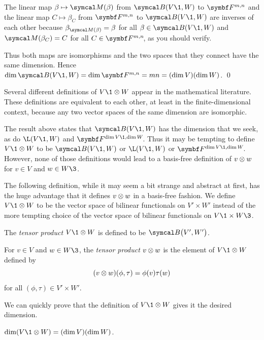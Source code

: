 The linear map $\beta \mapsto \M(\beta)$ from $\B(V\1, W)$ to $\F{m,n}$ and the linear map $C \mapsto \beta_C$ from
$\F{m,n}$ to $\B(V\1,W)$ are inverses of each other because $\beta_{\M(\beta)} = \beta$ for all $\beta \in \B(V\1, W)$ and
$\M(\beta_C) = C$ for all $C \in \FF{m,n}$, as you should verify.

Thus both maps are isomorphisms and the two spaces that they connect have the same dimension. Hence
$\dim \B(V\1,W)= \dim \F{m,n} = mn = (\dim V)(\dim W)$.
\qed

Several different definitions of $V\1 \tensor W$ appear in the mathematical literature. These definitions are equivalent to each other, at least in the finite-dimensional context, because any two vector spaces of the same dimension are isomorphic.

The result above states that $\B(V\1, W)$ has the dimension that we seek, as do $\L(V\1, W)$ and $\FF{\dim V\1, \dim W}$. Thus it may be tempting to define $V\1 \tensor W$ to be $\B(V\1, W)$ or $\L(V\1, W)$ or $\FF{\dim V\1, \dim W}$. However, none of those definitions would lead to a basis-free definition of $v \otimes w$ for $v \in V$ and $w \in W\3$.

The following definition, while it may seem a bit strange and abstract at first, has the huge advantage that it defines $v \otimes w$ in a basis-free fashion. We define $V\1 \tensor W$ to be the vector space of bilinear functionals on $V'\! \times W'$ instead of the more tempting choice of the vector space of bilinear functionals on $V\1 \times W\3$.

{\vspace{-2.3bp}
\begin{Itemize}\addtolength{\itemsep}{-.01in}
\item
The \emph{tensor product} $V\1 \tensor W$ is defined to be $\B\paren[\big]{V', W'}$.
\item
For $v \in V$ and $w \in W\3$, the \emph{tensor product} $v \otimes w$ is the element of $V\1 \tensor W$ defined by
\[
(v \otimes w)(\phi, \tau) = \phi(v) \tau(w)
\]
for all $(\phi, \tau) \in V'\! \times W'\!$.
\end{Itemize}}

We can quickly prove that the definition of $V\1 \tensor W$ gives it the desired dimension.

{$\dim (V\1 \tensor W) = (\dim V)(\dim W)$.}

